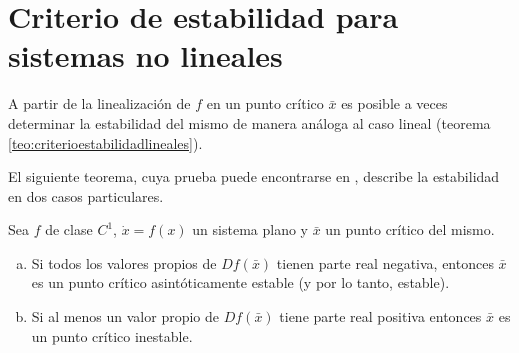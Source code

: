 \section{Criterio de estabilidad para sistemas no lineales}
A partir de la linealización de $f$ en un punto crítico $\bar{x}$ es posible a veces determinar la estabilidad del mismo de manera análoga al caso lineal (teorema \ref{teo:criterioestabilidadlineales}).

El siguiente teorema, cuya prueba puede encontrarse en \cite[p.~267,272]{dynandbif}, describe la estabilidad en dos casos particulares.

\begin{theorem} \label{teo:criterioestabilidadnolineales}
Sea $f$ de clase $C^1$, $\dot{x} = f(x)$ un sistema plano y $\bar{x}$ un punto crítico del mismo.

\begin{enumerate}[(a)]
	\item Si todos los valores propios de $Df(\bar{x})$ tienen parte real negativa, entonces $\bar{x}$ es un punto crítico asintóticamente estable (y por lo tanto, estable).
	\item Si al menos un valor propio de $Df(\bar{x})$ tiene parte real positiva entonces $\bar{x}$ es un punto crítico inestable.
\end{enumerate}
\end{theorem}

